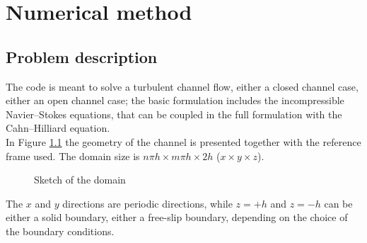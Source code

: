\chapter{Numerical method}
\label{chap: num_met}

\section{Problem description}
The code is meant to solve a turbulent channel flow, either a closed channel case, either an open channel case; the basic formulation includes the incompressible Navier--Stokes equations, that can be coupled in the full formulation with the Cahn--Hilliard equation.\\
In Figure \ref{fig: domain_sketch} the geometry of the channel is presented together with the reference frame used. The domain size is $n\pi h\times m\pi h \times 2h$ ($x\times y\times z$).
\begin{figure}[H]
\centering
\def\svgwidth{0.8\textwidth}

\caption{Sketch of the domain}
\label{fig: domain_sketch}
\end{figure}
The $x$ and $y$ directions are periodic directions, while $z=+h$ and $z=-h$ can be either a solid boundary, either a free-slip boundary, depending on the choice of the boundary conditions.

